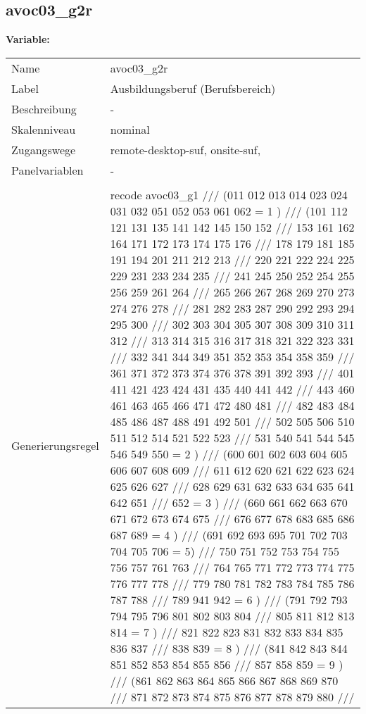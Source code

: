 	
	
	\subsection{avoc03\_g2r}
	\label{subSection:avoc03_g2r}

	\noindent\textbf{Variable:}\\
		\begin{tabular}{lL{11.3cm}}
			\label{tableVariable:avoc03_g2r}
			Name & avoc03\_g2r \\
			Label & Ausbildungsberuf (Berufsbereich) \\
			Beschreibung & - \\
			Skalenniveau & nominal \\
			Zugangswege &
				remote-desktop-suf,
				onsite-suf,
 \\
			Panelvariablen & -
			 \\
			 \\
					Generierungsregel & recode avoc03\_g1  ///
(011 012 013 014 023 024 031 032 051 052 053 061 062 = 1 ) ///
(101 112 121 131 135 141 142 145 150 152 ///
153 161 162 164 171 172 173 174 175 176 ///
178 179 181 185 191 194 201 211 212 213 ///
220 221 222 224 225 229 231 233 234 235 ///
241 245 250 252 254 255 256 259 261 264 ///
265 266 267 268 269 270 273 274 276 278 ///
281 282 283 287 290 292 293 294 295 300 ///
302 303 304 305 307 308 309 310 311 312 ///
313 314 315 316 317 318 321 322 323 331 ///
332 341 344 349 351 352 353 354 358 359 ///
361 371 372 373 374 376 378 391 392 393 ///
401 411 421 423 424 431 435 440 441 442 ///
443 460 461 463 465 466 471 472 480 481 ///
482 483 484 485 486 487 488 491 492 501 ///
502 505 506 510 511 512 514 521 522 523 ///
531 540 541 544 545 546 549 550 = 2 ) ///
(600 601 602 603 604 605 606 607 608 609 ///
611 612 620 621 622 623 624 625 626 627 ///
628 629 631 632 633 634 635 641 642 651 ///
652 = 3 ) ///
(660 661 662 663 670 671 672 673 674 675 ///
676 677 678 683 685 686 687 689 = 4 ) ///
(691 692 693 695 701 702 703 704 705 706 = 5) ///
750 751 752 753 754 755 756 757 761 763 ///
764 765 771 772 773 774 775 776 777 778 ///
779 780 781 782 783 784 785 786 787 788 ///
789 941 942 = 6 ) ///
(791 792 793 794 795 796 801 802 803 804 ///
805 811 812 813 814 = 7 ) ///
821 822 823 831 832 833 834 835 836 837 ///
838 839 = 8 ) ///
(841 842 843 844 851 852 853 854 855 856 ///
857 858 859 = 9 ) ///
(861 862 863 864 865 866 867 868 869 870 ///
871 872 873 874 875 876 877 878 879 880 ///

\end{tabular}
